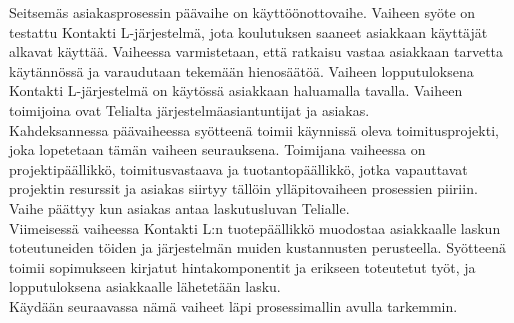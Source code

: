 \documentclass[finnish,12pt,a4paper,pdftex]{article}
\begin{document}
Seitsemäs asiakasprosessin päävaihe on käyttöönottovaihe. Vaiheen syöte on testattu Kontakti L-järjestelmä, jota koulutuksen saaneet asiakkaan käyttäjät alkavat käyttää. Vaiheessa varmistetaan, että ratkaisu vastaa asiakkaan tarvetta käytännössä ja varaudutaan tekemään hienosäätöä. Vaiheen lopputuloksena Kontakti L-järjestelmä on käytössä asiakkaan haluamalla tavalla. Vaiheen toimijoina ovat Telialta järjestelmäasiantuntijat ja asiakas.\\

Kahdeksannessa päävaiheessa syötteenä toimii käynnissä oleva toimitusprojekti, joka lopetetaan tämän vaiheen seurauksena. Toimijana vaiheessa on projektipäällikkö, toimitusvastaava ja tuotantopäällikkö, jotka vapauttavat projektin resurssit ja asiakas siirtyy tällöin ylläpitovaiheen prosessien piiriin. Vaihe päättyy kun asiakas antaa laskutusluvan Telialle.\\

Viimeisessä vaiheessa Kontakti L:n tuotepäällikkö muodostaa asiakkaalle laskun toteutuneiden töiden ja järjestelmän muiden kustannusten perusteella. Syötteenä toimii sopimukseen kirjatut hintakomponentit ja erikseen toteutetut työt, ja lopputuloksena asiakkaalle lähetetään lasku.\\

Käydään seuraavassa nämä vaiheet läpi prosessimallin avulla tarkemmin.


\end{document}
